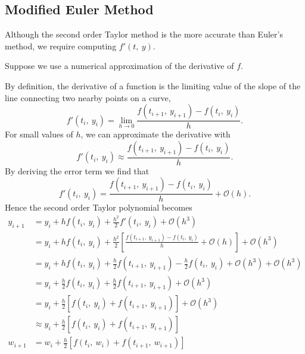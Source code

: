 \documentclass{article}
\begin{document}
\subsection{Modified Euler Method}
Although the second order Taylor method is the more accurate than Euler's method,
we require computing \(f'\left( t,\: y \right)\).

Suppose we use a numerical approximation of the derivative of \(f\).

By definition, the derivative of a function is the limiting value of the slope of the line connecting
two nearby points on a curve,
\begin{equation*}
    f'\left( t_i,\: y_i \right) = \lim_{h \to 0} \frac{f\left( t_{i + 1},\: y_{i + 1} \right) - f\left( t_i,\: y_i \right)}{h}.
\end{equation*}
For small values of \(h\), we can approximate the derivative with
\begin{equation*}
    f'\left( t_i,\: y_i \right) \approx \frac{f\left( t_{i + 1},\: y_{i + 1} \right) - f\left( t_i,\: y_i \right)}{h}.
\end{equation*}
By deriving the error term we find that
\begin{equation*}
    f'\left( t_i,\: y_i \right) = \frac{f\left( t_{i + 1},\: y_{i + 1} \right) - f\left( t_i,\: y_i \right)}{h} + \mathcal{O}\left( h \right).
\end{equation*}
Hence the second order Taylor polynomial becomes
\begin{align*}
    y_{i + 1} & = y_i + h f\left( t_i,\: y_i \right) + \frac{h^2}{2} f'\left( t_i,\: y_i \right) + \mathcal{O}\left( h^3 \right)                                                                                                \\
              & = y_i + h f\left( t_i,\: y_i \right) + \frac{h^2}{2} \left[ \frac{f\left( t_{i + 1},\: y_{i + 1} \right) - f\left( t_i,\: y_i \right)}{h} + \mathcal{O}\left( h \right) \right] + \mathcal{O}\left( h^3 \right) \\
              & = y_i + h f\left( t_i,\: y_i \right) + \frac{h}{2} f\left( t_{i + 1},\: y_{i + 1} \right) - \frac{h}{2} f\left( t_i,\: y_i \right) + \mathcal{O}\left( h^3 \right) + \mathcal{O}\left( h^3 \right)              \\
              & = y_i + \frac{h}{2} f\left( t_i,\: y_i \right) + \frac{h}{2} f\left( t_{i + 1},\: y_{i + 1} \right) + \mathcal{O}\left( h^3 \right)                                                                             \\
              & = y_i + \frac{h}{2} \left[ f\left( t_i,\: y_i \right) + f\left( t_{i + 1},\: y_{i + 1} \right) \right] + \mathcal{O}\left( h^3 \right)                                                                          \\
              & \approx y_i + \frac{h}{2} \left[ f\left( t_i,\: y_i \right) + f\left( t_{i + 1},\: y_{i + 1} \right) \right]                                                                                                    \\
    w_{i + 1} & = w_i + \frac{h}{2} \left[ f\left( t_i,\: w_i \right) + f\left( t_{i + 1},\: w_{i + 1} \right) \right]
\end{align*}
\end{document}
